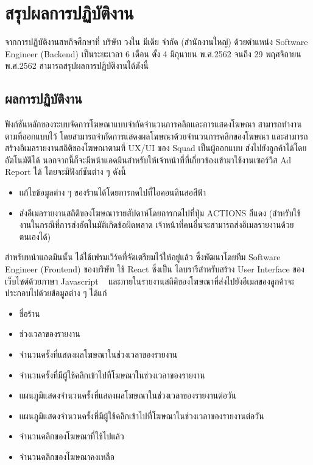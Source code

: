 \chapter{สรุปผลการปฏิบัติงาน}
\label{chapter:summary-result}

 จากการปฏิบัติงานสหกิจศึกษาที่ บริษัท วงใน มีเดีย จำกัด (สำนักงานใหญ่) ด้วยตำแหน่ง Software Engineer (Backend) เป็นระยะเวลา 6 เดือน ตั้ง 4 มิถุนายน พ.ศ.2562 จนถึง 29 พฤศจิกายน พ.ศ.2562 สามารถสรุปผลการปฏิบัติงานได้ดังนี้
 
 \section{ผลการปฏิบัติงาน}
ฟังก์ชันหลักของระบบจัดการโฆษณาแบบจำกัดจำนวนการคลิกและการแสดงโฆษณา สามารถทำงานตามที่ออกแบบไว้ โดยสามารถจำกัดการแสดงผลโฆษณาด้วยจำนวนการคลิกของโฆษณา และสามารถสร้างอีเมลรายงานสถิติของโฆษณาตามที่ UX/UI ของ Squad เป็นผู้ออกแบบ ส่งไปยังลูกค้าได้โดยอัตโนมัติได้ นอกจากนี้ก็จะมีหน้าแอดมินสำหรับให้เจ้าหน้าที่ที่เกี่ยวข้องเข้ามาใช้งานเซอร์วิส Ad Report ได้ โดยจะมีฟังก์ชันต่าง ๆ ดังนี้
\begin{itemize}
	\item แก้ไขข้อมูลต่าง ๆ ของร้านได้โดยการกดไปที่ไอคอนดินสอสีฟ้า
	\item ส่งอีเมลรายงานสถิติของโฆษณารายสัปดาห์โดยการกดไปที่ปุ่ม ACTIONS สีแดง (สำหรับใช้งานในกรณีที่การส่งอัตโนมัติเกิดข้อผิดพลาด เจ้าหน้าที่คนอื่นจะสามารถส่งอีเมลรายงานด้วยตนเองได้) 
\end{itemize}

สำหรับหน้าแอดมินนั้น ได้ใช้เฟรมเวิร์คที่จัดเตรียมไว้ให้อยู่แล้ว ซึ่งพัฒนาโดยทีม Software Engineer (Frontend) ของบริษัท ใช้ React ซึ่งเป็น ไลบรารีสำหรับสร้าง User Interface ของเว็บไซต์ด้วยภาษา Javascript ~\cite{react} และภายในรายงานสถิติของโฆษณาที่ส่งไปยังอีเมลของลูกค้าจะประกอบไปด้วยข้อมูลต่าง ๆ ได้แก่
\begin{itemize}
	\item ชื่อร้าน
	\item ช่วงเวลาของรายงาน
	\item จำนวนครั้งที่แสดงผลโฆษณาในช่วงเวลาของรายงาน
	\item จำนวนครั้งที่มีผู้ใช้คลิกเข้าไปที่โฆษณาในช่วงเวลาของรายงาน
	\item แผนภูมิแสดงจำนวนครั้งที่แสดงผลโฆษณาในช่วงเวลาของรายงานต่อวัน
	\item แผนภูมิแสดงจำนวนครั้งที่มีผู้ใช้คลิกเข้าไปที่โฆษณาในช่วงเวลาของรายงานต่อวัน
	\item จำนวนคลิกของโฆษณาที่ใช้ไปแล้ว
	\item จำนวนคลิกของโฆษณาคงเหลือ
\end{itemize}

